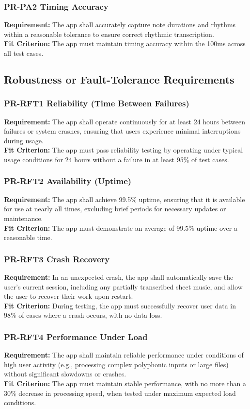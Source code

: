 \documentclass[12pt]{article}
\begin{document}
\subsubsection*{PR-PA2 Timing Accuracy}
\textbf{Requirement:} The app shall accurately capture note durations and rhythms within a reasonable tolerance to ensure correct rhythmic transcription.\\
\textbf{Fit Criterion:} The app must maintain timing accuracy within the 100ms across all test cases.

\subsection{Robustness or Fault-Tolerance Requirements}
\subsubsection*{PR-RFT1 Reliability (Time Between Failures)}
\textbf{Requirement:} The app shall operate continuously for at least 24 hours between failures or system crashes, ensuring that users experience minimal interruptions during usage.\\
\textbf{Fit Criterion:} The app must pass reliability testing by operating under typical usage conditions for 24 hours without a failure in at least 95\% of test cases.
\subsubsection*{PR-RFT2 Availability (Uptime)}
\textbf{Requirement:} The app shall achieve 99.5\% uptime, ensuring that it is available for use at nearly all times, excluding brief periods for necessary updates or maintenance.\\
\textbf{Fit Criterion:} The app must demonstrate an average of 99.5\% uptime over a reasonable time.
\subsubsection*{PR-RFT3 Crash Recovery}
\textbf{Requirement:} In an unexpected crash, the app shall automatically save the user’s current session, including any partially transcribed sheet music, and allow the user to recover their work upon restart.\\
\textbf{Fit Criterion:} During testing, the app must successfully recover user data in 98\% of cases where a crash occurs, with no data loss.
\subsubsection*{PR-RFT4 Performance Under Load}
\textbf{Requirement:} The app shall maintain reliable performance under conditions of high user activity (e.g., processing complex polyphonic inputs or large files) without significant slowdowns or crashes.\\
\textbf{Fit Criterion:} The app must maintain stable performance, with no more than a 30\% decrease in processing speed, when tested under maximum expected load conditions.
\end{document}
